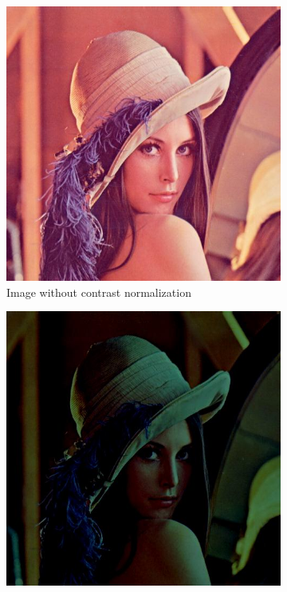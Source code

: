 \documentclass{article} %
\begin{document}
\begin{figure}
\begin{subfigure}{0.33\textwidth}
\centering
\includegraphics[scale=0.2]{images/lena}
\caption{Image without contrast normalization}
\end{subfigure}
\begin{subfigure}{0.33\textwidth}
\centering
\includegraphics[scale=0.2]{images/lena_mean}

\end{subfigure}
\end{figure}
\end{document}
